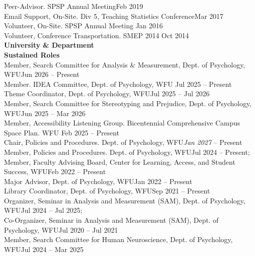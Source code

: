 Peer-Advisor. SPSP Annual Meeting\hfill{Feb 2019}\\
Email Support, On-Site. Div 5, Teaching Statistics Conference\hfill{Mar 2017}\\
Volunteer, On-Site. SPSP Annual Meeting \hfill{Jan 2016}\\
Volunteer, Conference Transportation. SMEP 2014  \hfill{Oct 2014}\medskip\\
{\large \textbf{University \& Department}}\\
\textrm{\textbf{Sustained Roles}}\\
Member, Search Committee for Analysis \& Measurement, Dept. of Psychology, WFU\hfill {Jun 2026 – Present}\\
Member. IDEA Committee, Dept. of Psychology, WFU \hfill{Jul 2025 – Present}\\ %
Theme Coordinator, Dept. of Psychology, WFU\hfill {Jul 2025 – Jul 2026}\\
Member, Search Committee for Stereotyping and Prejudice, Dept. of Psychology, WFU\hfill {Jun 2025 – Mar 2026}\\
Member, Accessibility Listening Group. \small{Bicentennial Comprehensive Campus Space Plan}. WFU \hfill{Feb 2025 – Present}\\ %
Chair, Policies and Procedures. Dept. of Psychology, WFU\hfill{\textit{Jan 2027} – Present}\newline
Member, Policies and Procedures. Dept. of Psychology, WFU\hfill{Jul 2024 – Present;}\newline
{}\\
Member, Faculty Advising Board, Center for Learning, Access, and Student Success, WFU\hfill {Feb 2022 – Present}\\
Major Advisor, Dept. of Psychology, WFU\hfill{Jan 2022 – Present}\\
Library Coordinator, Dept. of Psychology, WFU\hfill {Sep 2021 – Present}\\
Organizer, Seminar in Analysis and Measurement (SAM), Dept. of Psychology, WFU\hfill{Jul 2024 – Jul 2025;}\newline
{}\\
Co-Organizer, Seminar in Analysis and Measurement (SAM), Dept. of Psychology, WFU\hfill {Jul 2020 – Jul 2021}\\
Member, Search Committee for Human Neuroscience, Dept. of Psychology, WFU\hfill {Jul 2024 – Mar 2025}\\
